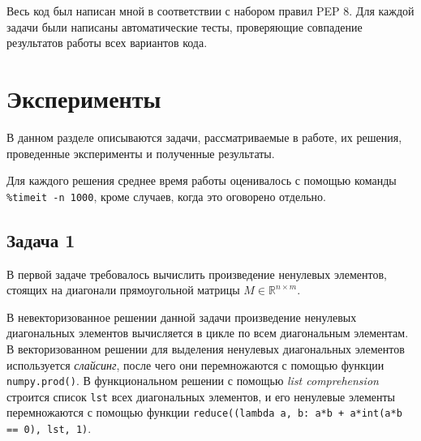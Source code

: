 \documentclass[12pt]{article}
\begin{document}
Весь код был написан мной в соответствии с набором правил PEP 8. Для каждой задачи были написаны автоматические тесты, проверяющие совпадение результатов работы всех вариантов кода.
\pagebreak
\section{Эксперименты}

	\hspace{0.6cm}В данном разделе описываются задачи, рассматриваемые в работе, их решения, проведенные эксперименты и полученные результаты. 
	
	Для каждого решения среднее время работы оценивалось с помощью команды \lstinline$%timeit -n 1000$, кроме случаев, когда это оговорено отдельно.

\subsection{Задача 1}

	\hspace{0.6cm}В первой задаче требовалось вычислить произведение ненулевых элементов, стоящих на диагонали прямоугольной матрицы $M \in \mathbb{R}^{n \times m}$. 
	
	В невекторизованное решении данной задачи произведение ненулевых диагональных элементов вычисляется в цикле по всем диагональным элементам. В векторизованном решении для выделения ненулевых диагональных элементов используется {\it слайсинг}, после чего они перемножаются с помощью функции \lstinline$numpy.prod()$. В функциональном решении с помощью {\it list comprehension} строится список \lstinline$lst$ всех диагональных элементов, и его ненулевые элементы перемножаются с помощью функции \lstinline$reduce((lambda a, b: a*b + a*int(a*b == 0), lst, 1)$.
	
\end{document}
